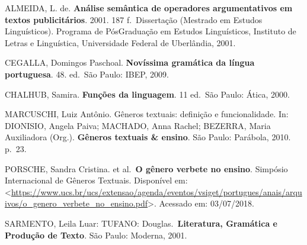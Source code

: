 ALMEIDA, L. de. \textbf{Análise semântica de operadores argumentativos
em textos publicitários}. 2001. 187 f.~Dissertação (Mestrado em Estudos
Linguísticos). Programa de PósGraduação em Estudos Linguísticos,
Instituto de Letras e Linguística, Universidade Federal de Uberlândia,
2001.

CEGALLA, Domingos Paschoal. \textbf{Novíssima gramática da língua
portuguesa}. 48. ed.~São Paulo: IBEP, 2009.

CHALHUB, Samira. \textbf{Funções da linguagem}. 11 ed.~São Paulo: Ática,
2000.

MARCUSCHI, Luiz Antônio. Gêneros textuais: definição e funcionalidade.
In: DIONISIO, Angela Paiva; MACHADO, Anna Rachel; BEZERRA, Maria
Auxiliadora (Org.). \textbf{Gêneros textuais \& ensino}. São Paulo:
Parábola, 2010. p.~23.

PORSCHE, Sandra Cristina. et al.~\textbf{O gênero verbete no ensino}.
Simpósio Internacional de Gêneros Textuais. Disponível em:
\textless{}\url{https://www.ucs.br/ucs/extensao/agenda/eventos/vsiget/portugues/anais/arquivos/o_genero_verbete_no_ensino.pdf}\textgreater.
Acessado em: 03/07/2018.

SARMENTO, Leila Luar: TUFANO: Douglas.~\textbf{Literatura, Gramática e
Produção de Texto}. São Paulo: Moderna, 2001.
